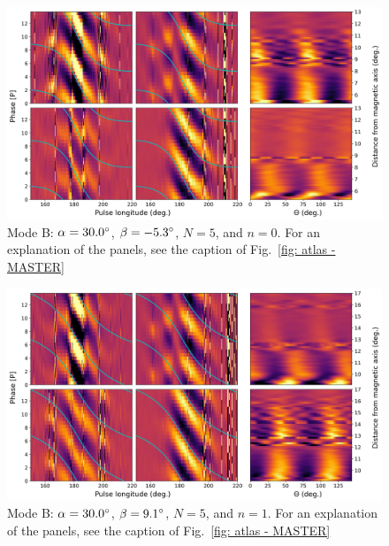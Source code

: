 \begin{figure}
	\begin{center}
		\includegraphics[width=\atlasHeightFrac\textwidth]{Figures/B0031/atlas/B_517030005000_plots}
		\caption[Atlas results: Mode B -- $\alpha=30.0\degr$, $\beta=-5.3\degr$, $N=5$, $n=0$]{Mode B: $\alpha=30.0\degr$, $\beta=-5.3\degr$, $N=5$, and $n=0$. For an explanation of the panels, see the caption of Fig.~\ref{fig: atlas - MASTER} }
		\label{fig: atlas - B_517030005000}
	\end{center}
\end{figure}

\begin{figure}
	\begin{center}
		\includegraphics[width=\atlasHeightFrac\textwidth]{Figures/B0031/atlas/B_517030005001_plots}
		\caption[Atlas results: Mode B -- $\alpha=30.0\degr$, $\beta=9.1\degr$, $N=5$, $n=1$]{Mode B: $\alpha=30.0\degr$, $\beta=9.1\degr$, $N=5$, and $n=1$. For an explanation of the panels, see the caption of Fig.~\ref{fig: atlas - MASTER} }
		\label{fig: atlas - B_517030005001}
	\end{center}
\end{figure}

